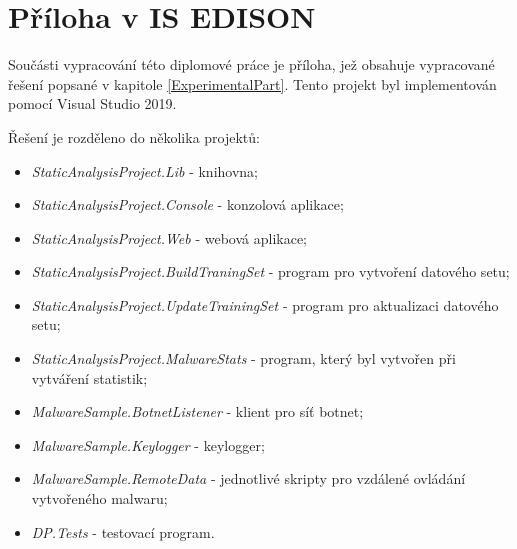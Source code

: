\documentclass[czech,master,dept460,male,cpp,cpdeclaration]{diploma}
\begin{document}
\MakeTitlePages











\newpage
\printbibliography[title={Literatura}, heading=bibintoc]

\appendix
\section{Příloha v IS EDISON}

Součásti vypracování této diplomové práce je příloha, jež obsahuje vypracované řešení popsané v kapitole \ref{ExperimentalPart}. Tento projekt byl implementován pomocí Visual Studio 2019.

Řešení je rozděleno do několika projektů:

\begin{itemize}
    \item \emph{StaticAnalysisProject.Lib} - knihovna;
    \item \emph{StaticAnalysisProject.Console} - konzolová aplikace;
    \item \emph{StaticAnalysisProject.Web} - webová aplikace;
    \item \emph{StaticAnalysisProject.BuildTraningSet} - program pro vytvoření datového setu;
    \item \emph{StaticAnalysisProject.UpdateTrainingSet} - program pro aktualizaci datového setu;
    \item \emph{StaticAnalysisProject.MalwareStats} - program, který byl vytvořen při vytváření statistik;
    
    \item \emph{MalwareSample.BotnetListener} - klient pro síť botnet;
    \item \emph{MalwareSample.Keylogger} - keylogger;
    \item \emph{MalwareSample.RemoteData} - jednotlivé skripty pro vzdálené ovládání vytvořeného malwaru;
    
    \item \emph{DP.Tests} - testovací program.
    
\end{itemize}
\end{document}
